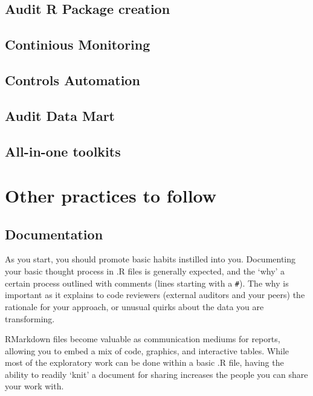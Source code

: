 \documentclass[
]{book}
\begin{document}
\hypertarget{auditpackage}{%
\section{Audit R Package creation}\label{auditpackage}}

\hypertarget{continious-monitoring}{%
\section{Continious Monitoring}\label{continious-monitoring}}

\hypertarget{controls-automation}{%
\section{Controls Automation}\label{controls-automation}}

\hypertarget{audit-data-mart-1}{%
\section{Audit Data Mart}\label{audit-data-mart-1}}

\hypertarget{all-in-one-toolkits}{%
\section{All-in-one toolkits}\label{all-in-one-toolkits}}

\hypertarget{other-practices-to-follow}{%
\chapter{Other practices to follow}\label{other-practices-to-follow}}

\hypertarget{documentation}{%
\section{Documentation}\label{documentation}}

As you start, you should promote basic habits instilled into you. Documenting your basic thought process in .R files is generally expected, and the `why' a certain process outlined with comments (lines starting with a \texttt{\#}). The why is important as it explains to code reviewers (external auditors and your peers) the rationale for your approach, or unusual quirks about the data you are transforming.

RMarkdown files become valuable as communication mediums for reports, allowing you to embed a mix of code, graphics, and interactive tables. While most of the exploratory work can be done within a basic .R file, having the ability to readily `knit' a document for sharing increases the people you can share your work with.
\end{document}
